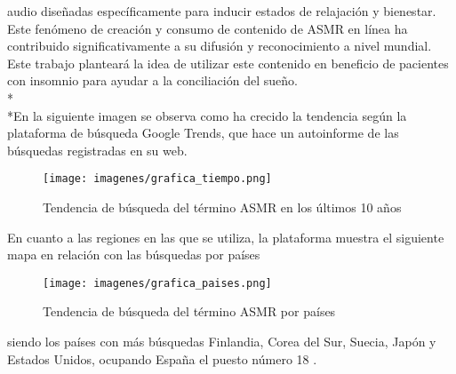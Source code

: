 \documentclass[a4paper,12pt,twoside]{memoir}
\begin{document}
\begin{itemize}
audio diseñadas específicamente para inducir estados de relajación y bienestar. Este fenómeno de creación y consumo de contenido de ASMR en línea ha contribuido significativamente a su difusión y reconocimiento a nivel mundial. Este trabajo planteará la idea de utilizar este contenido en beneficio de pacientes con insomnio para ayudar a la conciliación del sueño.\\*\\*En la siguiente imagen se observa como ha crecido la tendencia según la plataforma de búsqueda Google Trends, que hace un autoinforme de las búsquedas registradas en su web\cite{google2024trends}.

\begin{figure}[h]
    \centering
    \texttt{[image: imagenes/grafica\_tiempo.png]} 
    \caption{Tendencia de búsqueda del término ASMR en los últimos 10 años}
    \label{fig:ejemplo}
\end{figure}
\text En cuanto a las regiones en las que se utiliza, la plataforma muestra el siguiente mapa en relación con las búsquedas por países  
\begin{figure}[h]
    \centering
    \texttt{[image: imagenes/grafica\_paises.png]} 
    \caption{Tendencia de búsqueda del término ASMR por países}
    \label{fig:ejemplo}
\end{figure}
\text siendo los países con más búsquedas Finlandia, Corea del Sur, Suecia, Japón y Estados Unidos, ocupando España el puesto número 18 \cite{remfit}.


\end{itemize}
\end{document}
